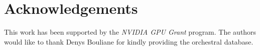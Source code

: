 \documentclass{article}
\begin{document}
%
%
%

\section{Acknowledgements}
This work has been supported by the \textit{NVIDIA GPU Grant} program.
The authors would like to thank Denys Bouliane for kindly providing the orchestral database.


\end{document}
